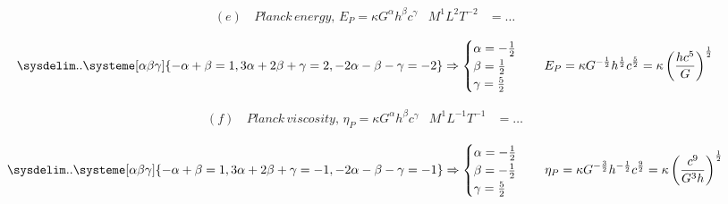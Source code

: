 \documentclass[]{article}
\begin{document}
{			\begin{equation*}	
				\begin{aligned}
					(e) & \, Planck \, energy, \, E_P = \kappa G^{\alpha} h^{\beta} c^{\gamma}  & M^1 L^2 T^{-2} &= \dots
					\\
				\end{aligned}
			\end{equation*}
				\begin{equation*}
					\sysdelim..\systeme[\alpha\beta\gamma]{
						-\alpha + \beta = 1, 
						3\alpha + 2\beta + \gamma = 2,
						-2\alpha - \beta - \gamma = -2
					} \Rightarrow
					\begin{cases}
						\alpha = -\frac{1}{2} \\ 
						\beta = \frac{1}{2} \\
						\gamma = \frac{5}{2}
					\end{cases}
					\quad
					E_P = \kappa G^{-\frac{1}{2}} h^{\frac{1}{2}} c^{\frac{5}{2}} = \kappa \left( \frac{hc^5}{G} \right)^\frac{1}{2}
				\end{equation*}
			
			\begin{equation*}	
				\begin{aligned}
					(f) & \, Planck \, viscosity, \, \eta_P = \kappa G^{\alpha} h^{\beta} c^{\gamma}  & M^1 L^{-1} T^{-1} &= \dots
					\\
				\end{aligned}
			\end{equation*}
				\begin{equation*}
					\sysdelim..\systeme[\alpha\beta\gamma]{
						-\alpha + \beta = 1, 
						3\alpha + 2\beta + \gamma = -1,
						-2\alpha - \beta - \gamma = -1
					} \Rightarrow
					\begin{cases}
						\alpha = -\frac{1}{2} \\
						\beta = -\frac{1}{2} \\
						\gamma = \frac{5}{2}
					\end{cases}
					\quad
					\eta_P = \kappa G^{-\frac{3}{2}} h^{-\frac{1}{2}} c^{\frac{9}{2}} = \kappa \left( \frac{c^9}{G^3h} \right)^\frac{1}{2}
				\end{equation*}
			
}
\end{document}

